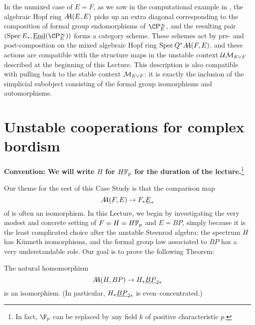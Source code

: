 \begin{remark}
In the unmixed case of \(E = F\), as we saw in the computational example in , the algebraic Hopf ring \(\AA(E, E)\) picks up an extra diagonal corresponding to the composition of formal group endomorphisms of \(\CP^\infty_E\), and the resulting pair \((\Spec E_*, \underline{\operatorname{End}}(\CP^\infty_E))\) forms a category scheme.  These schemes act by pre- and post-composition on the mixed algebraic Hopf ring \(\Spec Q^* \AA(F, E)\), and these actions are compatible with the structure maps in the unstable context \(\Ucontext{E \vee F}\) described at the beginning of this Lecture.  This description is also compatible with pulling back to the stable context \(\context{E \vee F}\): it is exactly the inclusion of the simplicial subobject consisting of the formal group isomorphisms and automorphisms.
\end{remark}













\section{Unstable cooperations for complex bordism}\label{COableCoopnsII}

\begin{center}
\textbf{Convention: We will write \(H\) for \(\HFp\) for the duration of the lecture.}\footnote{In fact, \(\F_p\) can be replaced by any field \(k\) of positive characteristic \(p\).}
\end{center}

Our theme for the rest of this Case Study is that the comparison map \[\AA(F, E) \to F_* \OS{E}{*}\] of  is often an isomorphism.  In this Lecture, we begin by investigating the very modest and concrete setting of \(F = H = \HFp\) and \(E = BP\), simply because it is the least complicated choice after the unstable Steenrod algebra: the spectrum \(H\) has K\"unneth isomorphisms, and the formal group law associated to \(BP\) has a very understandable role.  Our goal is to prove the following Theorem:

\begin{theorem}\label{HFpBPCooperationsTheorem}
The natural homomorphism \[\AA(H, BP) \to H_* \OS{BP}{2*}\] is an isomorphism.  (In particular, \(H_* \OS{BP}{2*}\) is even--concentrated.)
\end{theorem}

